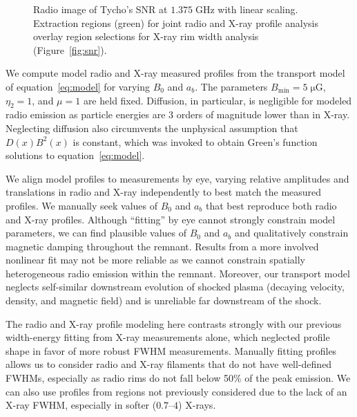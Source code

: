 \documentclass[iop, apj, numberedappendix]{emulateapj}
\newcommand*{\mt}{\mathrm}
\newcommand*{\unit}[1]{\;\mt{#1}}  %
\newcommand*{\muG}{\unit{\mu G}}
\begin{document}
\begin{figure}
    \centering
    \iftoggle{manuscript}{
        \texttt{[image: figures/radio-snr-inv.png]}
    }{
        \plotone{figures/radio-snr-inv.png}
    }
    \caption{Radio image of Tycho's SNR at $1.375 \unit{GHz}$ with linear
    scaling.  Extraction regions (green) for joint radio and X-ray profile
    analysis overlay region selections for X-ray rim width analysis
    (Figure~\ref{fig:snr}). \label{fig:radio-snr}}
\end{figure}

We compute model radio and X-ray measured profiles from the transport model of
equation~\eqref{eq:model} for varying $B_0$ and $a_b$.  The parameters
$B_{\mt{min}} = 5 \muG$, $\eta_2 = 1$, and $\mu = 1$ are held fixed.
Diffusion, in particular, is negligible for modeled radio emission as particle
energies are 3 orders of magnitude lower than in X-ray.  Neglecting diffusion
also circumvents the unphysical assumption that $D(x) B^2(x)$ is constant,
which was invoked to obtain Green's function solutions to
equation~\eqref{eq:model}.

We align model profiles to measurements by eye, varying relative amplitudes and
translations in radio and X-ray independently to best match the measured
profiles.  We manually seek values of $B_0$ and $a_b$ that best reproduce both
radio and X-ray profiles.  Although ``fitting'' by eye cannot strongly
constrain model parameters, we can find plausible values of $B_0$ and $a_b$
and qualitatively constrain magnetic damping throughout the remnant.  Results
from a more involved nonlinear fit may not be more reliable as we cannot
constrain spatially heterogeneous radio emission within the remnant.  Moreover,
our transport model neglects self-similar downstream evolution of shocked
plasma (decaying velocity, density, and magnetic field) and is unreliable far
downstream of the shock.

The radio and X-ray profile modeling here contrasts strongly with our previous
width-energy fitting from X-ray measurements alone, which neglected profile
shape in favor of more robust FWHM measurements.  Manually fitting profiles
allows us to consider radio and X-ray filaments that do not have well-defined
FWHMs, especially as radio rims do not fall below 50\% of the peak emission.
We can also use profiles from regions not previously considered due to the lack
of an X-ray FWHM, especially in softer ($0.7$--$4$) X-rays.
\end{document}
